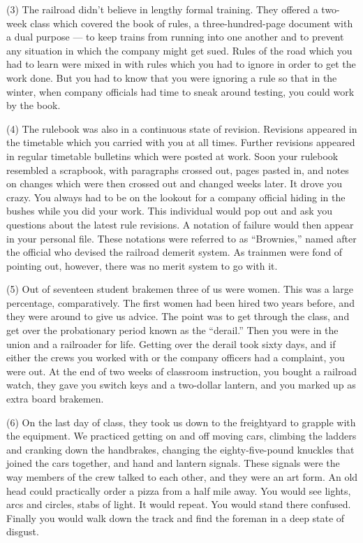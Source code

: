 \documentclass[UTF8,11pt]{ctexart}
\begin{document}
(3) The railroad didn’t believe in lengthy formal training. They offered a two-week class which covered the book of rules, a three-hundred-page document with a dual purpose — to keep trains from running into one another and to prevent any situation in which the company might get sued. Rules of the road which you had to learn were mixed in with rules which you had to ignore in order to get the work done. But you had to know that you were ignoring a rule so that in the winter, when company officials had time to sneak around testing, you could work by the book.


(4) The rulebook was also in a continuous state of revision. Revisions appeared in the timetable which you carried with you at all times. Further revisions appeared in regular timetable bulletins which were posted at work. Soon your rulebook resembled a scrapbook, with paragraphs crossed out, pages pasted in, and notes on changes which were then crossed out and changed weeks later. It drove you crazy. You always had to be on the lookout for a company official hiding in the bushes while you did your work. This individual would pop out and ask you questions about the latest rule revisions. A notation of failure would then appear in your personal file. These notations were referred to as “Brownies,” named after the official who devised the railroad demerit system. As trainmen were fond of pointing out, however, there was no merit system to go with it.


(5) Out of seventeen student brakemen three of us were women. This was a large percentage, comparatively. The first women had been hired two years before, and they were around to give us advice. The point was to get through the class, and get over the probationary period known as the “derail.” Then you were in the union and a railroader for life. Getting over the derail took sixty days, and if either the crews you worked with or the company officers had a complaint, you were out. At the end of two weeks of classroom instruction, you bought a railroad watch, they gave you switch keys and a two-dollar lantern, and you marked up as extra board brakemen.


(6) On the last day of class, they took us down to the freightyard to grapple with the equipment. We practiced getting on and off moving cars, climbing the ladders and cranking down the handbrakes, changing the eighty-five-pound knuckles that joined the cars together, and hand and lantern signals. These signals were the way members of the crew talked to each other, and they were an art form. An old head could practically order a pizza from a half mile away. You would see lights, arcs and circles, stabs of light. It would repeat. You would stand there confused. Finally you would walk down the track and find the foreman in a deep state of disgust.
\end{document}
